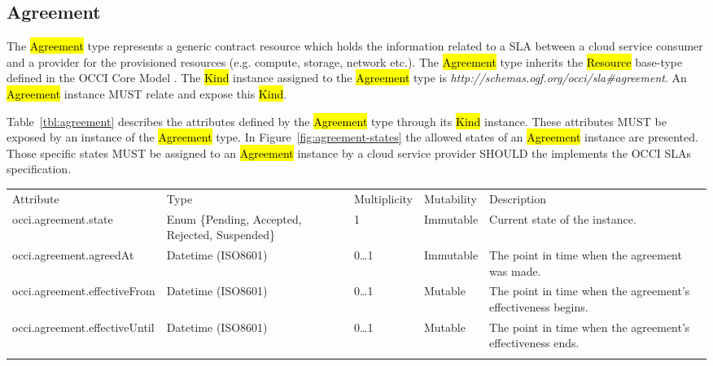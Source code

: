 \documentclass[10pt,a4paper]{article}
\begin{document}
\subsection{Agreement}

The \hl{Agreement} type represents a generic contract resource which holds the information related to a SLA between a cloud service consumer and a provider for the provisioned resources (e.g. compute, storage, network etc.). The \hl{Agreement} type inherits the \hl{Resource} base-type defined in the OCCI Core Model \cite{occi:core}. The \hl{Kind} instance assigned to the \hl{Agreement} type is \textit{http://schemas.ogf.org/occi/sla\#agreement}. An \hl{Agreement} instance MUST relate and expose this \hl{Kind}.

Table~\ref{tbl:agreement} describes the attributes defined by the \hl{Agreement} type through its \hl{Kind} instance. These attributes MUST be exposed by an instance of the \hl{Agreement} type. In Figure~\ref{fig:agreement-states} the allowed states of an \hl{Agreement} instance are presented. Those specific states MUST be assigned to an \hl{Agreement} instance by a cloud service provider SHOULD the implements the OCCI SLAs specification. 


{
	\begin{tabular}{lp{2.5cm}p{1cm}lp{6cm}}
	\toprule
	Attribute&Type&Multi\-plicity&Mutability&Description\\
	\colrule
	occi.agreement.state & Enum \{Pending, Accepted, Rejected, Suspended\} & 1 & Immutable & Current state of the instance.\\
	occi.agreement.agreedAt & Datetime (ISO8601) & 0\ldots1 & Immutable & The point in time when the agreement was made. \\
	occi.agreement.effectiveFrom & Datetime (ISO8601) & 0\ldots1 & Mutable & The point in time when the agreement’s effectiveness begins. \\
	occi.agreement.effectiveUntil & Datetime (ISO8601) & 0\ldots1 & Mutable & The point in time when the agreement’s effectiveness ends. \\
	\botrule
	\end{tabular}
}
\end{document}
